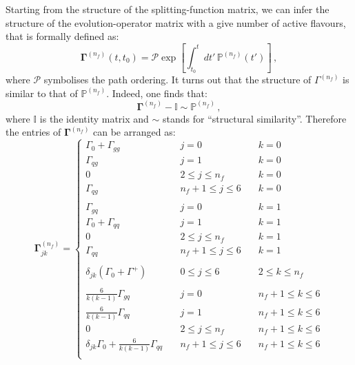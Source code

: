 \documentclass[10pt,a4paper]{article}
\begin{document}
Starting from the structure of the splitting-function matrix, we can
infer the structure of the evolution-operator matrix with a give
number of active flavours, that is formally defined as:
\begin{equation}
{\bm\Gamma}^{(n_f)}(t,t_0) = \mathcal{P}\exp\left[\int_{t_0}^tdt'\,\mathbb{P}^{(n_f)}(t')\right]\,,
\end{equation}
where $\mathcal{P}$ symbolises the path ordering. It turns out that
the structure of $\Gamma^{(n_f)}$ is similar to that of
$\mathbb{P}^{(n_f)}$. Indeed, one finds that:
\begin{equation}
{\bm\Gamma}^{(n_f)}-\mathbb{I} \sim \mathbb{P}^{(n_f)}\,,
\end{equation}
where $\mathbb{I}$ is the identity matrix and $\sim$ stands for
``structural similarity''. Therefore the entries of
${\bm\Gamma}^{(n_f)}$ can be arranged as:
\begin{equation}\label{eq:evolopalg}
{\bm\Gamma}_{jk}^{(n_f)}=
\left\{
\begin{array}{lll}
\Gamma_0+\Gamma_{gg} & \quad j = 0 &\quad k = 0\\
\Gamma_{qg} & \quad j = 1 &\quad k = 0\\
0 & \quad 2 \leq j \leq n_f &\quad k = 0\\
\Gamma_{qg} & \quad n_f+1 \leq j \leq 6  &\quad k = 0\\
\\
\Gamma_{gq} & \quad j = 0 & \quad k=1\\
\Gamma_0 + \Gamma_{qq} & \quad j = 1 & \quad k=1\\
0 & \quad 2 \leq j \leq n_f &\quad k = 1\\
\Gamma_{qq} & \quad n_f+1 \leq j \leq 6  & \quad k=1\\
\\
\delta_{jk}(\Gamma_0+\Gamma^+) & \quad 0 \leq j \leq 6 & \quad 2 \leq k \leq
                                              n_f\\
\\
\frac{6}{k(k-1)}\Gamma_{gq} &\quad j = 0 & \quad n_f+1 \leq k \leq 6\\
\frac{6}{k(k-1)}\Gamma_{qq} &\quad j = 1 & \quad n_f+1 \leq k \leq 6\\
0 &\quad 2 \leq j \leq n_f & \quad n_f+1 \leq k \leq 6 \\
\delta_{jk}\Gamma_0+ \frac{6}{k(k-1)}\Gamma_{qq}
            &\quad n_f+1 \leq j \leq 6 & \quad n_f+1 \leq k \leq 6\\
\end{array}
\right.
\end{equation}
\end{document}
